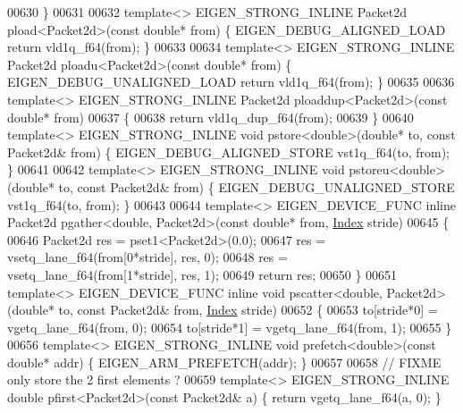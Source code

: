 \begin{DoxyCode}
{{00630 \}
00631 
00632 \textcolor{keyword}{template}<> EIGEN\_STRONG\_INLINE Packet2d pload<Packet2d>(\textcolor{keyword}{const} \textcolor{keywordtype}{double}* from) \{ EIGEN\_DEBUG\_ALIGNED\_LOAD \textcolor{keywordflow}{
      return} vld1q\_f64(from); \}
00633 
00634 \textcolor{keyword}{template}<> EIGEN\_STRONG\_INLINE Packet2d ploadu<Packet2d>(\textcolor{keyword}{const} \textcolor{keywordtype}{double}* from) \{ EIGEN\_DEBUG\_UNALIGNED\_LOAD \textcolor{keywordflow}{
      return} vld1q\_f64(from); \}
00635 
00636 \textcolor{keyword}{template}<> EIGEN\_STRONG\_INLINE Packet2d ploaddup<Packet2d>(\textcolor{keyword}{const} \textcolor{keywordtype}{double}*   from)
00637 \{
00638   \textcolor{keywordflow}{return} vld1q\_dup\_f64(from);
00639 \}
00640 \textcolor{keyword}{template}<> EIGEN\_STRONG\_INLINE \textcolor{keywordtype}{void} pstore<double>(\textcolor{keywordtype}{double}*   to, \textcolor{keyword}{const} Packet2d& from) \{ 
      EIGEN\_DEBUG\_ALIGNED\_STORE vst1q\_f64(to, from); \}
00641 
00642 \textcolor{keyword}{template}<> EIGEN\_STRONG\_INLINE \textcolor{keywordtype}{void} pstoreu<double>(\textcolor{keywordtype}{double}*  to, \textcolor{keyword}{const} Packet2d& from) \{ 
      EIGEN\_DEBUG\_UNALIGNED\_STORE vst1q\_f64(to, from); \}
00643 
00644 \textcolor{keyword}{template}<> EIGEN\_DEVICE\_FUNC \textcolor{keyword}{inline} Packet2d pgather<double, Packet2d>(\textcolor{keyword}{const} \textcolor{keywordtype}{double}* from, 
      \hyperlink{namespace_eigen_a62e77e0933482dafde8fe197d9a2cfde}{Index} stride)
00645 \{
00646   Packet2d res = pset1<Packet2d>(0.0);
00647   res = vsetq\_lane\_f64(from[0*stride], res, 0);
00648   res = vsetq\_lane\_f64(from[1*stride], res, 1);
00649   \textcolor{keywordflow}{return} res;
00650 \}
00651 \textcolor{keyword}{template}<> EIGEN\_DEVICE\_FUNC \textcolor{keyword}{inline} \textcolor{keywordtype}{void} pscatter<double, Packet2d>(\textcolor{keywordtype}{double}* to, \textcolor{keyword}{const} Packet2d& from, 
      \hyperlink{namespace_eigen_a62e77e0933482dafde8fe197d9a2cfde}{Index} stride)
00652 \{
00653   to[stride*0] = vgetq\_lane\_f64(from, 0);
00654   to[stride*1] = vgetq\_lane\_f64(from, 1);
00655 \}
00656 \textcolor{keyword}{template}<> EIGEN\_STRONG\_INLINE \textcolor{keywordtype}{void} prefetch<double>(\textcolor{keyword}{const} \textcolor{keywordtype}{double}* addr) \{ EIGEN\_ARM\_PREFETCH(addr); \}
00657 
00658 \textcolor{comment}{// FIXME only store the 2 first elements ?}
00659 \textcolor{keyword}{template}<> EIGEN\_STRONG\_INLINE \textcolor{keywordtype}{double} pfirst<Packet2d>(\textcolor{keyword}{const} Packet2d& a) \{ \textcolor{keywordflow}{return} vgetq\_lane\_f64(a, 0); \}
}}
\end{DoxyCode}
